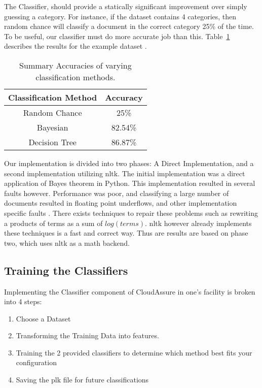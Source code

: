 The Classifier, should provide a statically significant improvement over simply
guessing a category. For instance, if the dataset contains 4 categories, then
random chance will classify a document in the correct category 25\% of the time.
To be useful, our classifier must do more accurate job than this.
Table~\ref{tab:classification_accuracy} describes the results for the example
dataset \autocite{University}.

\begin{table}[h!]
    \centering
    \begin{tabular}{c | c }
        \hline
        Classification Method & Accuracy \\
        \hline \hline
        Random Chance & 25\%\\
        Bayesian & 82.54\% \\
        Decision Tree & 86.87\% \\
    \end{tabular}
    \caption{Summary Accuracies of varying classification methods.}
    \label{tab:classification_accuracy}
\end{table}

Our implementation is divided into two phases: A Direct Implementation, and
a second implementation utilizing \gls{nltk}. The initial implementation was
a direct application of Bayes theorem in Python. This implementation resulted in
several faults however. Performance was poor, and classifying a large number of
documents resulted in floating point underflows, and other implementation
specific faults \autocite{Graham-Cummings2005}. There exists techniques to repair these problems such as
rewriting a products  of terms as a sum of \(log(terms) \). \gls{nltk} however
already implements these techniques is a fast and correct way. Thus are results
are based on phase two, which uses \gls{nltk} as a math backend.\autocite{Denoyer2004}

\subsection{Training the Classifiers}
Implementing the Classifier component of CloudAssure in one's facility is broken
into 4 steps:
\begin{enumerate}
    \item Choose a Dataset
    \item Transforming the Training Data into features.
    \item Training the 2 provided classifiers to determine which method best
        fits your configuration
    \item Saving the plk file for future classifications
\end{enumerate}

